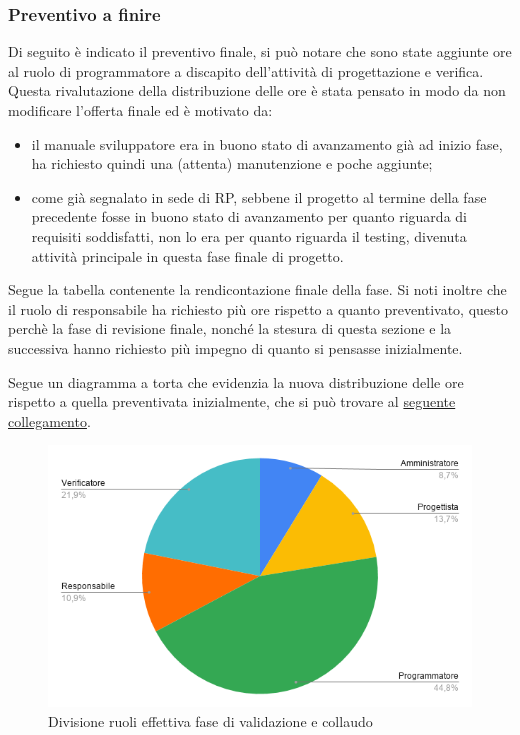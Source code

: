     \subsubsection{Preventivo a finire}
        Di seguito è indicato il preventivo finale, si può notare che sono state aggiunte ore al ruolo di programmatore a discapito dell'attività di progettazione e verifica. Questa rivalutazione della distribuzione delle ore è stata pensato in modo da non modificare l'offerta finale ed è motivato da:
        \begin{itemize}
            \item il manuale sviluppatore era in buono stato di avanzamento già ad inizio fase, ha richiesto quindi una (attenta) manutenzione e poche aggiunte;
            \item come già segnalato in sede di RP, sebbene il progetto al termine della fase precedente fosse in buono stato di avanzamento per quanto riguarda di requisiti soddisfatti, non lo era per quanto riguarda il testing, divenuta attività principale in questa fase finale di progetto.
        \end{itemize}
        Segue la tabella contenente la rendicontazione finale della fase.
        \def\salarycontent{
            {Amministratore,16,20,320},
            {Analista,      0,25,0},
            {Progettista,   25,22,550},
            {Programmatore, 82,15,1230},
            {Responsabile,  20,30,600},
            {Verificatore,  40,15,600},
            {Totale,        188,127,3300},
        }
        Si noti inoltre che il ruolo di responsabile ha richiesto più ore rispetto a quanto preventivato, questo perchè la fase di revisione finale, nonché la stesura di questa sezione e la successiva hanno richiesto più impegno di quanto si pensasse inizialmente.
        
        Segue un diagramma a torta che evidenzia la nuova distribuzione delle ore rispetto a quella preventivata inizialmente, che si può trovare al \hyperref[image:verifica_ruoli]{seguente collegamento}. 
        \begin{figure}[H]
            \centering
            \includegraphics[width=\textwidth]{source/img/verifica_ruoli_modificato.png}
            \caption{Divisione ruoli effettiva fase di validazione e collaudo}
        \end{figure}
